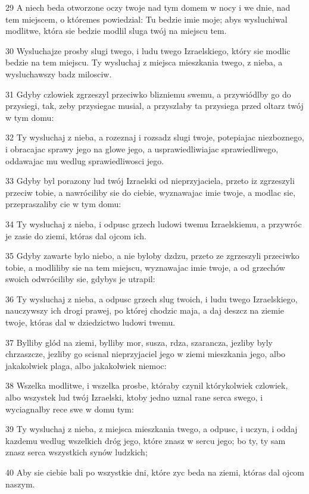 \par 29 A niech beda otworzone oczy twoje nad tym domem w nocy i we dnie, nad tem miejscem, o któremes powiedzial: Tu bedzie imie moje; abys wysluchiwal modlitwe, która sie bedzie modlil sluga twój na miejscu tem.
\par 30 Wysluchajze prosby slugi twego, i ludu twego Izraelskiego, który sie modlic bedzie na tem miejscu. Ty wysluchaj z miejsca mieszkania twego, z nieba, a wysluchawszy badz milosciw.
\par 31 Gdyby czlowiek zgrzeszyl przeciwko blizniemu swemu, a przywiódlby go do przysiegi, tak, zeby przysiegac musial, a przyszlaby ta przysiega przed oltarz twój w tym domu:
\par 32 Ty wysluchaj z nieba, a rozeznaj i rozsadz slugi twoje, potepiajac niezboznego, i obracajac sprawy jego na glowe jego, a usprawiedliwiajac sprawiedliwego, oddawajac mu wedlug sprawiedliwosci jego.
\par 33 Gdyby byl porazony lud twój Izraelski od nieprzyjaciela, przeto iz zgrzeszyli przeciw tobie, a nawróciliby sie do ciebie, wyznawajac imie twoje, a modlac sie, przepraszaliby cie w tym domu:
\par 34 Ty wysluchaj z nieba, i odpusc grzech ludowi twemu Izraelskiemu, a przywróc je zasie do ziemi, któras dal ojcom ich.
\par 35 Gdyby zawarte bylo niebo, a nie byloby dzdzu, przeto ze zgrzeszyli przeciwko tobie, a modliliby sie na tem miejscu, wyznawajac imie twoje, a od grzechów swoich odwróciliby sie, gdybys je utrapil:
\par 36 Ty wysluchaj z nieba, a odpusc grzech slug twoich, i ludu twego Izraelskiego, nauczywszy ich drogi prawej, po której chodzic maja, a daj deszcz na ziemie twoje, któras dal w dziedzictwo ludowi twemu.
\par 37 Bylliby glód na ziemi, bylliby mor, susza, rdza, szarancza, jezliby byly chrzaszcze, jezliby go scisnal nieprzyjaciel jego w ziemi mieszkania jego, albo jakakolwiek plaga, albo jakakolwiek niemoc:
\par 38 Wszelka modlitwe, i wszelka prosbe, któraby czynil którykolwiek czlowiek, albo wszystek lud twój Izraelski, ktoby jedno uznal rane serca swego, i wyciagnalby rece swe w domu tym:
\par 39 Ty wysluchaj z nieba, z miejsca mieszkania twego, a odpusc, i uczyn, i oddaj kazdemu wedlug wszelkich dróg jego, które znasz w sercu jego; bo ty, ty sam znasz serca wszystkich synów ludzkich;
\par 40 Aby sie ciebie bali po wszystkie dni, które zyc beda na ziemi, któras dal ojcom naszym.
